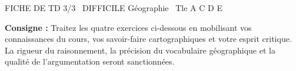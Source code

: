 \documentclass[11pt]{article}
\begin{document}
\begin{tcolorbox}[enhanced,colback=popink,colframe=popink,arc=10pt,boxrule=0pt,left=12pt,right=12pt,top=9pt,bottom=9pt]
{\color{white}\popxbold\small FICHE DE TD 3/3 \textbullet\ DIFFICILE \hfill Géographie \textbullet\ Tle A C D E\par}
\end{tcolorbox}
\vspace{4pt}
\noindent \textbf{Consigne :} Traitez les quatre exercices ci-dessous en mobilisant vos connaissances du cours, vos savoir-faire cartographiques et votre esprit critique. La rigueur du raisonnement, la précision du vocabulaire géographique et la qualité de l'argumentation seront sanctionnées.
\end{document}
